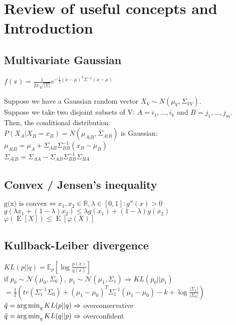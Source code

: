 \section{Review of useful concepts and Introduction}
\subsection{Multivariate Gaussian}
$f(x) = \frac{1}{2\pi \sqrt{|\Sigma|}} e^{- \frac{1}{2} (x-\mu)^T \Sigma^{-1} (x-\mu)}$

Suppose we have a Gaussian random vector $X_V \sim N(\mu_V, \Sigma_{VV})$.\\
Suppose we take two disjoint subsets of V: $A={i_1,...,i_k}$ and $B={j_1,...,j_m}$.\\
Then, the conditional distribution: \\
$P(X_A|X_B=x_B)=N(\mu_{A|B}, \Sigma_{A|B})$ is Gaussian:\\
$\mu_{A|B}=\mu_A+\Sigma_{AB}\Sigma^{-1}_{BB}(x_B-\mu_B)$\\
$\Sigma_{A|B}=\Sigma_{AA}-\Sigma_{AB}\Sigma^{-1}_{BB}\Sigma_{BA}$

\subsection{Convex / Jensen's inequality}
$\text{g(x) is convex} \Leftrightarrow x_1,x_2 \in \mathbb{R}, \lambda \in [0,1]: g''(x) > 0$\\
$g(\lambda x_1 + (1-\lambda) x_2) \leq \lambda g(x_1) + (1-\lambda) g(x_2)$
$\varphi(\operatorname{E}[X]) \leq  \operatorname{E}[\varphi(X)]$
\subsection{Kullback-Leiber divergence}
$KL(p\vert\vert q)=\mathbb{E}_p\left[\log\frac{p(x)}{q(x)}\right]$\\
if $p_0\sim \mathcal{N}(\mu_0,\Sigma_0),\; p_1\sim \mathcal{N}(\mu_1,\Sigma_1) \Rightarrow KL(p_0\vert\vert p_1)$\\
{\scriptsize$ = \frac{1}{2}\left(tr\left(\Sigma_1^{-1}\Sigma_0\right) + (\mu_1-\mu_0)^T\Sigma_1^{-1}(\mu_1-\mu_0)-k+\log\frac{\vert\Sigma_1\vert}{\vert\Sigma_0\vert}\right)$}\\
$\hat q = \operatorname*{arg\,min}_q KL(p\vert\vert q) \Rightarrow$ overconservative\\
$\hat q = \operatorname*{arg\,min}_q KL(q\vert\vert p) \Rightarrow$ overconfident
